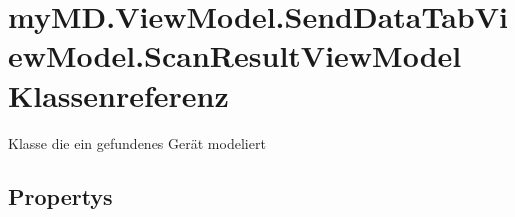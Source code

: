 \hypertarget{classmy_m_d_1_1_view_model_1_1_send_data_tab_view_model_1_1_scan_result_view_model}{}\section{my\+M\+D.\+View\+Model.\+Send\+Data\+Tab\+View\+Model.\+Scan\+Result\+View\+Model Klassenreferenz}
\label{classmy_m_d_1_1_view_model_1_1_send_data_tab_view_model_1_1_scan_result_view_model}


Klasse die ein gefundenes Gerät modeliert  


\subsection*{Propertys}
